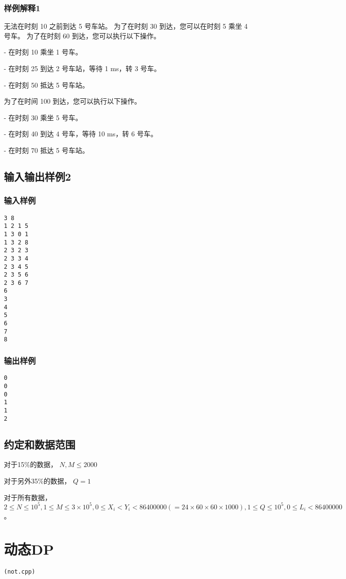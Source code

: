 \documentclass[UTF8]{ctexart}
\begin{document}
\subsubsection{样例解释1}

无法在时刻 10 之前到达 5 号车站。 为了在时刻 30 到达，您可以在时刻 5 乘坐 4 号车。 为了在时刻 60 到达，您可以执行以下操作。

- 在时刻 10 乘坐 1 号车。

- 在时刻 25 到达 2 号车站，等待 1 ms，转 3 号车。

- 在时刻 50 抵达 5 号车站。

为了在时间 100 到达，您可以执行以下操作。

- 在时刻 30 乘坐 5 号车。

- 在时刻 40 到达 4 号车，等待 10 ms，转 6 号车。

- 在时刻 70 抵达 5 号车站。

\subsection{输入输出样例2}
\subsubsection{输入样例}

\begin{lstlisting}
3 8
1 2 1 5
1 3 0 1
1 3 2 8
2 3 2 3
2 3 3 4
2 3 4 5
2 3 5 6
2 3 6 7
6
3
4
5
6
7
8
\end{lstlisting}


\subsubsection{输出样例}

\begin{lstlisting}
0
0
0
1
1
2
\end{lstlisting}

\subsection{约定和数据范围}

对于15\%的数据， $N,M\le 2000$

对于另外35\%的数据， $Q=1$

对于所有数据， $2\le N\le 10^5,1\le M\le 3\times 10^5,0\le X_i<Y_i<86400000(=24\times 60\times 60\times 1000),1\le Q\le 10^5,0\le L_i<86400000$。



\newpage
\section{动态DP}
\begin{center}
\tt\large{(not.cpp)}
\end{center}
\end{document}

